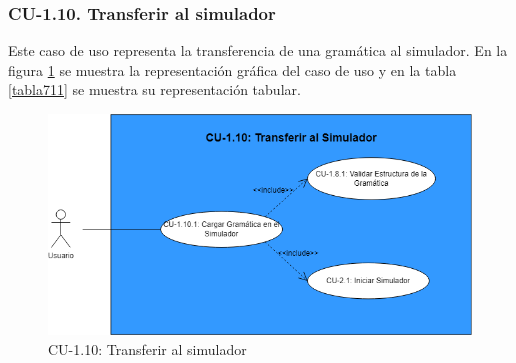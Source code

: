  \subsubsection{CU-1.10. Transferir al simulador}

 Este caso de uso representa la transferencia de una gramática al simulador. En la figura \ref{fig:CU110} se muestra la representación gráfica del caso de uso y en la tabla \ref{tabla711} se muestra su representación tabular.

 \begin{figure}[H]
       \begin{center} 
 	\includegraphics[scale=0.55]{figuras/Cap7/CU110.png}
 	\caption{CU-1.10: Transferir al simulador}
 	\label{fig:CU110}
       \end{center}
   \end{figure}

